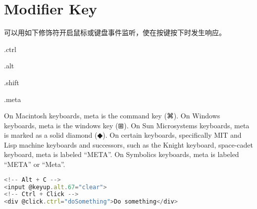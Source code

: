 \section{Modifier Key}


可以用如下修饰符开启鼠标或键盘事件监听，使在按键按下时发生响应。


\begin{compactitem}
\item .ctrl
\item .alt
\item .shift
\item .meta
\end{compactitem}

On Macintosh keyboards, meta is the command key (⌘). On Windows keyboards, meta is the windows key (⊞). On Sun Microsystems keyboards, meta is marked as a solid diamond (◆). On certain keyboards, specifically MIT and Lisp machine keyboards and successors, such as the Knight keyboard, space-cadet keyboard, meta is labeled “META”. On Symbolics keyboards, meta is labeled “META” or “Meta”.

\begin{lstlisting}[language=JavaScript]
<!-- Alt + C -->
<input @keyup.alt.67="clear">
<!-- Ctrl + Click -->
<div @click.ctrl="doSomething">Do something</div>
\end{lstlisting}


\begin{lstlisting}[language=JavaScript]

\end{lstlisting}



\begin{lstlisting}[language=JavaScript]

\end{lstlisting}